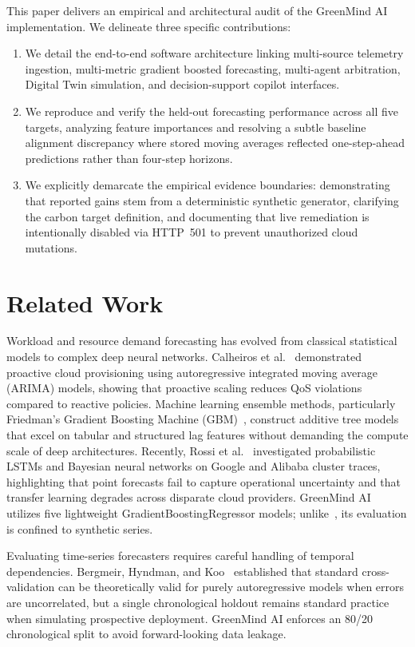 \documentclass[conference]{IEEEtran}
\begin{document}
This paper delivers an empirical and architectural audit of the GreenMind AI implementation. We delineate three specific contributions:
\begin{enumerate}
    \item We detail the end-to-end software architecture linking multi-source telemetry ingestion, multi-metric gradient boosted forecasting, multi-agent arbitration, Digital Twin simulation, and decision-support copilot interfaces.
    \item We reproduce and verify the held-out forecasting performance across all five targets, analyzing feature importances and resolving a subtle baseline alignment discrepancy where stored moving averages reflected one-step-ahead predictions rather than four-step horizons.
    \item We explicitly demarcate the empirical evidence boundaries: demonstrating that reported gains stem from a deterministic synthetic generator, clarifying the carbon target definition, and documenting that live remediation is intentionally disabled via HTTP~501 to prevent unauthorized cloud mutations.
\end{enumerate}

\section{Related Work}
Workload and resource demand forecasting has evolved from classical statistical models to complex deep neural networks. Calheiros et al.~\cite{r7} demonstrated proactive cloud provisioning using autoregressive integrated moving average (ARIMA) models, showing that proactive scaling reduces QoS violations compared to reactive policies. Machine learning ensemble methods, particularly Friedman's Gradient Boosting Machine (GBM)~\cite{r1}, construct additive tree models that excel on tabular and structured lag features without demanding the compute scale of deep architectures. Recently, Rossi et al.~\cite{r3} investigated probabilistic LSTMs and Bayesian neural networks on Google and Alibaba cluster traces, highlighting that point forecasts fail to capture operational uncertainty and that transfer learning degrades across disparate cloud providers. GreenMind AI utilizes five lightweight GradientBoostingRegressor models; unlike~\cite{r3}, its evaluation is confined to synthetic series.

Evaluating time-series forecasters requires careful handling of temporal dependencies. Bergmeir, Hyndman, and Koo~\cite{r2} established that standard cross-validation can be theoretically valid for purely autoregressive models when errors are uncorrelated, but a single chronological holdout remains standard practice when simulating prospective deployment. GreenMind AI enforces an 80/20 chronological split to avoid forward-looking data leakage.
\end{document}
